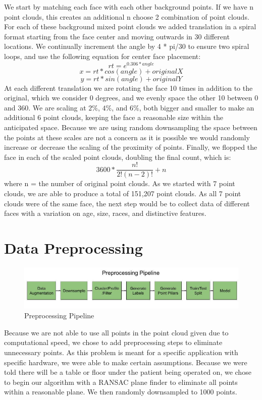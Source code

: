 \documentclass{article}
\begin{document}
We start by matching each face with each other background points. If we have n point clouds, this creates an additional n choose 2 combination of point clouds. 
For each of these background mixed point clouds we added translation in a spiral format starting from the face center and moving outwards in 30 different locations. We continually increment the angle by 4 * pi/30 to ensure two spiral loops, and use the following equation for center face placement:
\[rt = e^{0.306*angle}\]
\[x = rt * cos(angle) + originalX\]
\[y = rt * sin(angle) + originalY\]
At each different translation we are rotating the face 10 times in addition to the original, which we consider 0 degrees, and we evenly space the other 10 between 0 and 360. We are scaling at ${2\%}$, ${4\%}$, and ${6\%}$, both bigger and smaller to make an additional 6 point clouds, keeping the face a reasonable size within the anticipated space. Because we are using random downsampling the space between the points at these scales are not a concern as it is possible we would randomly increase or decrease the scaling of the proximity of points. 
Finally, we flopped the face in each of the scaled point clouds, doubling the final count, which is:
\[
    3600 * \frac{n!}{2!(n-2)!} + n
\]
where n = the number of original point clouds. As we started with 7 point clouds, we are able to produce a total of 151,207 point clouds. As all 7 point clouds were of the same face, the next step would be to collect data of different faces with a variation on age, size, races, and distinctive features. 
\section{Data Preprocessing}
\begin{figure}[htp]
    \centering
    \includegraphics[scale=0.4]{PreprocessingPipeline.jpg}
    \caption{Preprocessing Pipeline}
    \label{fig:preprocessingPipeline}
\end{figure}
Because we are not able to use all points in the point cloud given due to computational speed, we chose to add preprocessing steps to eliminate unnecessary points. As this problem is meant for a specific application with specific hardware, we were able to make certain assumptions. Because we were told there will be a table or floor under the patient being operated on, we chose to begin our algorithm with a RANSAC plane finder to eliminate all points within a reasonable plane. We then randomly downsampled to 1000 points. 
\end{document}
